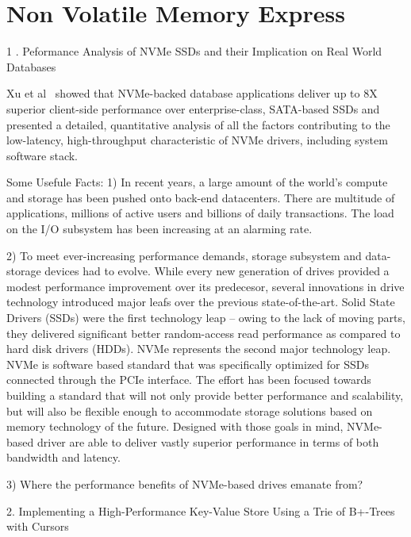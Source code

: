 \section{Non Volatile Memory Express}

1 . Peformance Analysis of NVMe SSDs and their Implication on Real World Databases

Xu et al~\cite{XXX} showed that NVMe-backed
database applications deliver up to 8X
superior client-side performance over enterprise-class,
SATA-based SSDs and presented a detailed, quantitative
analysis of all the factors contributing to the low-latency,
high-throughput characteristic of NVMe drivers, including
system software stack.

Some Usefule Facts:
1) In recent years, a large amount of the world's compute and 
storage has been pushed onto back-end datacenters.
There are multitude of applications, millions of active users
and billions of daily transactions. The load on the I/O subsystem
has been increasing at an alarming rate.

2) To meet ever-increasing performance demands, storage subsystem
and data-storage devices had to evolve. While every new generation
of drives provided a modest performance improvement over its predecesor,
several innovations in drive technology introduced major leafs over
the previous state-of-the-art. Solid State Drivers (SSDs) were
the first technology leap -- owing to the lack of moving parts,
they delivered significant better random-access read performance
as compared to hard disk drivers (HDDs). NVMe represents the
second major technology leap. NVMe is software based standard
that was specifically optimized for SSDs connected through the PCIe
interface. The effort has been focused towards building a standard
that will not only provide better performance and scalability,
but will also be flexible enough to accommodate storage solutions
based on memory technology of the future. Designed with
those goals in mind, NVMe-based driver are able to deliver
vastly superior performance in terms of both bandwidth
and latency. 

3) Where the performance benefits of NVMe-based
drives emanate from? 






2. Implementing a High-Performance Key-Value Store Using a Trie of B+-Trees with Cursors



